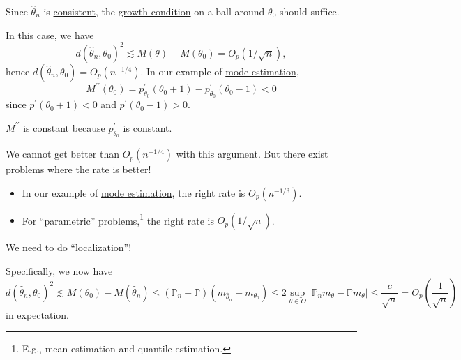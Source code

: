 \begin{intuition}
	Since \(\hat{\theta } _n \) is \hyperref[def:consistent]{consistent}, the \hyperref[def:growth-condition]{growth condition} on a ball around \(\theta _0\) should suffice.
\end{intuition}

In this case, we have
\[
	d(\hat{\theta } _n, \theta _0)^2 \lesssim M(\theta ) - M(\theta _0) = O_p(1 / \sqrt{n} ),
\]
hence \(d(\hat{\theta } _n, \theta _0) = O_p(n^{-1 / 4})\). In our example of \hyperref[eg:mode-estimation]{mode estimation},
\[
	M^{\prime\prime} (\theta _0)
	= p_{\theta _0}^{\prime} (\theta _0 + 1) - p_{\theta _0}^{\prime} (\theta _0 - 1)
	< 0
\]
since \(p^{\prime} (\theta _0+1) < 0\) and \(p^{\prime} (\theta _0 - 1) > 0\).

\begin{note}
	\(M^{\prime\prime} \) is constant because \(p_{\theta _0}^{\prime} \) is constant.
\end{note}

\begin{remark}
	We cannot get better than \(O_p(n^{-1 / 4})\) with this argument. But there exist problems where the rate is better!
	\begin{itemize}
		\item In our example of \hyperref[eg:mode-estimation]{mode estimation}, the right rate is \(O_p(n^{-1 / 3})\).
		\item For \hyperref[def:parametric]{``parametric''} problems,\footnote{E.g., mean estimation and quantile estimation.} the right rate is \(O_p(1 / \sqrt{n} )\).
	\end{itemize}
	We need to do ``localization''!
\end{remark}

Specifically, we now have
\[
	d(\hat{\theta } _n, \theta _0)^2
	\lesssim M(\theta _0) - M(\hat{\theta } _n )
	\leq (\mathbb{P} _n - \mathbb{P} ) (m_{\hat{\theta } _n } - m_{\theta _0})
	\leq 2 \sup _{\theta \in \Theta } \vert \mathbb{P} _n m_\theta - \mathbb{P} m_\theta \vert
	\leq \frac{c}{\sqrt{n} }
	= O_p \left( \frac{1}{\sqrt{n} } \right)
\]
in expectation.

